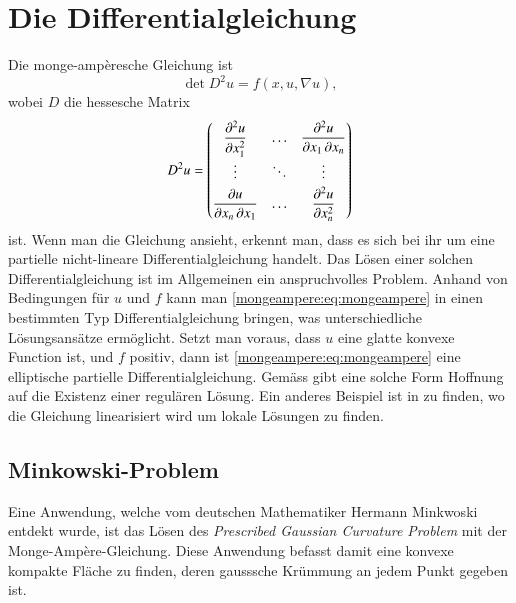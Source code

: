%
%
%
%
\section{Die Differentialgleichung\label{mongeampere:section:teil0}}
Die monge-ampèresche Gleichung ist
\begin{equation}
  \det D^2 u = f(x, u, \nabla u),
  \label{mongeampere:eq:mongeampere}
\end{equation}
wobei $D$ die hessesche Matrix
\begin{equation}
  D^2 u =
\renewcommand{\arraystretch}{1.7}
  \begin{pmatrix}
    \displaystyle \frac{\partial^2 u}{\partial x_1^2\mathstrut}
	& \dots
		&\displaystyle \frac{\partial^2 u}{\partial x_1 \,\partial x_n\mathstrut} \\
  \vdots & \ddots & \vdots \\
  \displaystyle \frac{\partial u}{\partial x_n \,\partial x_1\mathstrut}
	& \dots
		&\displaystyle \frac{\partial^2 u}{\partial x_n^2\mathstrut} \\
  \end{pmatrix}
  \label{mongeampere:eq:hess}
\end{equation}
ist.
Wenn man die Gleichung ansieht, erkennt man, dass es sich bei ihr um eine partielle
nicht-lineare Differentialgleichung handelt.
Das Lösen einer solchen Differentialgleichung ist im Allgemeinen ein anspruchvolles Problem.
Anhand von Bedingungen für $u$ und $f$ kann man \eqref{mongeampere:eq:mongeampere} 
in einen bestimmten Typ Differentialgleichung bringen, was unterschiedliche Lösungsansätze ermöglicht.
Setzt man voraus, dass $u$ eine glatte konvexe Function ist, und $f$ positiv, dann ist \eqref{mongeampere:eq:mongeampere}
eine elliptische partielle Differentialgleichung.
%
Gemäss \cite{mongeampere:figalli2018mongeampereequation} gibt eine solche Form Hoffnung auf die Existenz einer regulären Lösung.
Ein anderes Beispiel ist in \cite{mongeampere:figalli2022prescribednegativegausscurvature} zu finden, wo die 
Gleichung linearisiert wird um lokale Lösungen zu finden.

\subsection{Minkowski-Problem}
%
Eine Anwendung, welche vom deutschen Mathematiker Hermann Minkwoski entdekt wurde, ist das Lösen des
%
\emph{Prescribed Gaussian Curvature Problem} mit der Monge-Ampère-Gleichung.
%
Diese Anwendung befasst damit eine konvexe kompakte Fläche zu finden, deren gausssche Krümmung 
an jedem Punkt gegeben ist.


